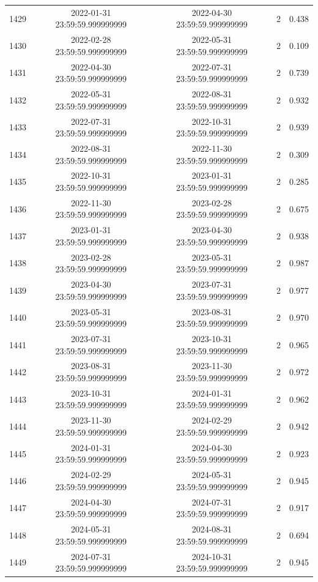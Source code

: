 \begin{table}
\begin{tabular}{lcccc}
1429 & 2022-01-31 23:59:59.999999999 & 2022-04-30 23:59:59.999999999 & 2 & 0.438 \\
1430 & 2022-02-28 23:59:59.999999999 & 2022-05-31 23:59:59.999999999 & 2 & 0.109 \\
1431 & 2022-04-30 23:59:59.999999999 & 2022-07-31 23:59:59.999999999 & 2 & 0.739 \\
1432 & 2022-05-31 23:59:59.999999999 & 2022-08-31 23:59:59.999999999 & 2 & 0.932 \\
1433 & 2022-07-31 23:59:59.999999999 & 2022-10-31 23:59:59.999999999 & 2 & 0.939 \\
1434 & 2022-08-31 23:59:59.999999999 & 2022-11-30 23:59:59.999999999 & 2 & 0.309 \\
1435 & 2022-10-31 23:59:59.999999999 & 2023-01-31 23:59:59.999999999 & 2 & 0.285 \\
1436 & 2022-11-30 23:59:59.999999999 & 2023-02-28 23:59:59.999999999 & 2 & 0.675 \\
1437 & 2023-01-31 23:59:59.999999999 & 2023-04-30 23:59:59.999999999 & 2 & 0.938 \\
1438 & 2023-02-28 23:59:59.999999999 & 2023-05-31 23:59:59.999999999 & 2 & 0.987 \\
1439 & 2023-04-30 23:59:59.999999999 & 2023-07-31 23:59:59.999999999 & 2 & 0.977 \\
1440 & 2023-05-31 23:59:59.999999999 & 2023-08-31 23:59:59.999999999 & 2 & 0.970 \\
1441 & 2023-07-31 23:59:59.999999999 & 2023-10-31 23:59:59.999999999 & 2 & 0.965 \\
1442 & 2023-08-31 23:59:59.999999999 & 2023-11-30 23:59:59.999999999 & 2 & 0.972 \\
1443 & 2023-10-31 23:59:59.999999999 & 2024-01-31 23:59:59.999999999 & 2 & 0.962 \\
1444 & 2023-11-30 23:59:59.999999999 & 2024-02-29 23:59:59.999999999 & 2 & 0.942 \\
1445 & 2024-01-31 23:59:59.999999999 & 2024-04-30 23:59:59.999999999 & 2 & 0.923 \\
1446 & 2024-02-29 23:59:59.999999999 & 2024-05-31 23:59:59.999999999 & 2 & 0.945 \\
1447 & 2024-04-30 23:59:59.999999999 & 2024-07-31 23:59:59.999999999 & 2 & 0.917 \\
1448 & 2024-05-31 23:59:59.999999999 & 2024-08-31 23:59:59.999999999 & 2 & 0.694 \\
1449 & 2024-07-31 23:59:59.999999999 & 2024-10-31 23:59:59.999999999 & 2 & 0.945 \\

\end{tabular}
\end{table}
